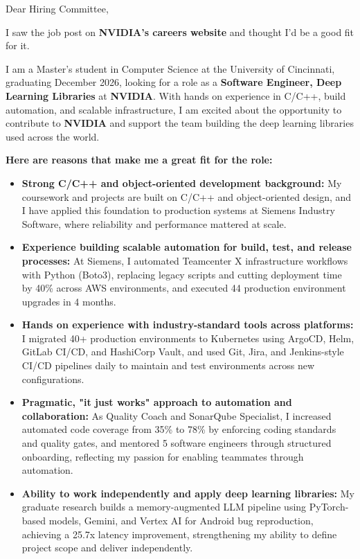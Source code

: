 \documentclass[11pt]{letter}
\date{}
\begin{document}
\begin{letter}{}

\opening{Dear Hiring Committee,}

I saw the job post on \textbf{NVIDIA's careers website} and thought I'd be a good fit for it.

I am a Master's student in Computer Science at the University of Cincinnati, graduating December 2026, looking for a role as a \textbf{Software Engineer, Deep Learning Libraries} at \textbf{NVIDIA}. With hands on experience in C/C++, build automation, and scalable infrastructure, I am excited about the opportunity to contribute to \textbf{NVIDIA} and support the team building the deep learning libraries used across the world.

\textbf{Here are reasons that make me a great fit for the role:}

\begin{itemize}[leftmargin=*, itemsep=0.45em]
    \item \textbf{Strong C/C++ and object-oriented development background:} My coursework and projects are built on C/C++ and object-oriented design, and I have applied this foundation to production systems at Siemens Industry Software, where reliability and performance mattered at scale.

    \item \textbf{Experience building scalable automation for build, test, and release processes:} At Siemens, I automated Teamcenter X infrastructure workflows with Python (Boto3), replacing legacy scripts and cutting deployment time by 40\% across AWS environments, and executed 44 production environment upgrades in 4 months.

    \item \textbf{Hands on experience with industry-standard tools across platforms:} I migrated 40+ production environments to Kubernetes using ArgoCD, Helm, GitLab CI/CD, and HashiCorp Vault, and used Git, Jira, and Jenkins-style CI/CD pipelines daily to maintain and test environments across new configurations.

    \item \textbf{Pragmatic, "it just works" approach to automation and collaboration:} As Quality Coach and SonarQube Specialist, I increased automated code coverage from 35\% to 78\% by enforcing coding standards and quality gates, and mentored 5 software engineers through structured onboarding, reflecting my passion for enabling teammates through automation.

    \item \textbf{Ability to work independently and apply deep learning libraries:} My graduate research builds a memory-augmented LLM pipeline using PyTorch-based models, Gemini, and Vertex AI for Android bug reproduction, achieving a 25.7x latency improvement, strengthening my ability to define project scope and deliver independently.
\end{itemize}


\end{letter}
\end{document}
